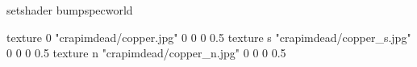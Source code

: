 setshader bumpspecworld

texture 0 "crapimdead/copper.jpg" 0 0 0 0.5
texture s "crapimdead/copper_s.jpg" 0 0 0 0.5
texture n "crapimdead/copper_n.jpg" 0 0 0 0.5